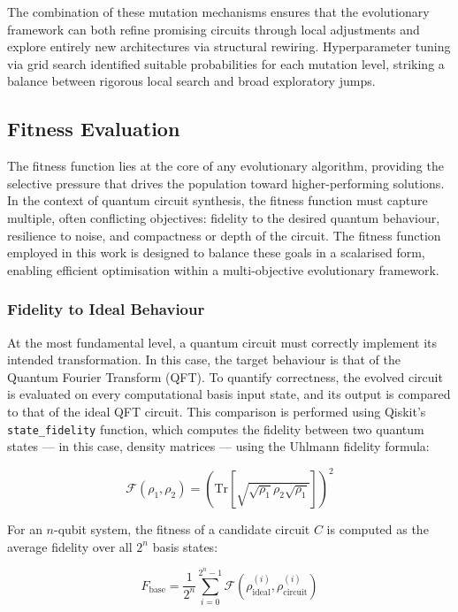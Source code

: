 \documentclass[11pt,a4paper]{article}
\begin{document}
The combination of these mutation mechanisms ensures that the evolutionary framework can both refine promising circuits through local adjustments and explore entirely new architectures via structural rewiring. Hyperparameter tuning via grid search identified suitable probabilities for each mutation level, striking a balance between rigorous local search and broad exploratory jumps.

\subsection{Fitness Evaluation}
\label{sec:fitness}

The fitness function lies at the core of any evolutionary algorithm, providing the selective pressure that drives the population toward higher-performing solutions. In the context of quantum circuit synthesis, the fitness function must capture multiple, often conflicting objectives: fidelity to the desired quantum behaviour, resilience to noise, and compactness or depth of the circuit. The fitness function employed in this work is designed to balance these goals in a scalarised form, enabling efficient optimisation within a multi-objective evolutionary framework.

\subsubsection*{Fidelity to Ideal Behaviour}

At the most fundamental level, a quantum circuit must correctly implement its intended transformation. In this case, the target behaviour is that of the Quantum Fourier Transform (QFT). To quantify correctness, the evolved circuit is evaluated on every computational basis input state, and its output is compared to that of the ideal QFT circuit. This comparison is performed using Qiskit's \texttt{state\_fidelity} function, which computes the fidelity between two quantum states — in this case, density matrices — using the Uhlmann fidelity formula:

\[
\mathcal{F}(\rho_1, \rho_2) = \left( \mathrm{Tr}\left[ \sqrt{ \sqrt{\rho_1} \rho_2 \sqrt{\rho_1} } \right] \right)^2
\]

For an $n$-qubit system, the fitness of a candidate circuit $C$ is computed as the average fidelity over all $2^n$ basis states:

\[
F_{\text{base}} = \frac{1}{2^n} \sum_{i=0}^{2^n - 1} \mathcal{F} \left( \rho_{\text{ideal}}^{(i)}, \rho_{\text{circuit}}^{(i)} \right)
\]
\end{document}
